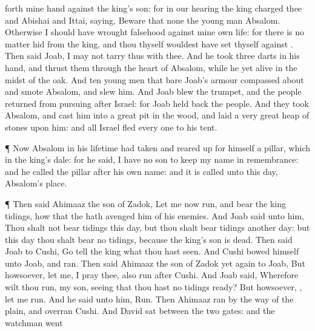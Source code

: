 {forth mine
hand against the
king’s
son: for in our
hearing the
king
charged thee and
Abishai and
Ittai,
saying,
Beware that none
{} the young
man
Absalom.
Otherwise I should have
wrought
falsehood against mine own
life: for there is no
matter
hid from the
king, and thou thyself wouldest have
set thyself against
{}.
Then
said
Joab, I may not
tarry thus with
thee. And he
took
three
darts in his
hand, and
thrust them through the
heart of
Absalom, while he
{} yet
alive in the midst of the
oak.
And
ten young
men that
bare
Joab’s
armour compassed
about and
smote
Absalom, and
slew him.
And
Joab
blew the
trumpet, and the
people
returned from
pursuing
after
Israel: for
Joab held
back the
people.
And they
took
Absalom, and
cast him into a
great
pit in the
wood, and
laid a
very
great
heap of
stones upon him: and all
Israel
fled every
one to his
tent.
\par }{\PP {}¶ Now
Absalom in his
lifetime had
taken and reared
up for himself a
pillar, which
{} in the
king’s
dale: for he
said, I have no
son to keep my
name in
remembrance: and he
called the
pillar after his own
name: and it is
called unto this
day,
Absalom’s
place.
\par }{\PP {}¶ Then
said
Ahimaaz the
son of
Zadok, Let me now
run, and
bear the
king
tidings, how that the
{} hath
avenged him of his
enemies.
And
Joab
said unto him,
Thou shalt not bear
tidings this
day, but thou shalt bear
tidings
another
day: but this
day thou shalt bear no
tidings, because the
king’s
son is
dead.
Then
said
Joab to
Cushi,
Go
tell the
king what thou hast
seen. And
Cushi
bowed himself unto
Joab, and
ran.
Then
said
Ahimaaz the
son of
Zadok yet
again to
Joab, But
howsoever, let me, I pray thee, also
run
after
Cushi. And
Joab
said, Wherefore wilt thou
run, my
son, seeing that thou hast no
tidings
ready?
But howsoever,
{}, let me
run. And he
said unto him,
Run. Then
Ahimaaz
ran by the
way of the
plain, and
overran
Cushi.
And
David
sat between the
two
gates: and the
watchman went
}
